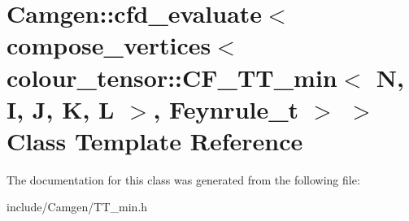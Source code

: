 \hypertarget{a00056}{\section{Camgen\-:\-:cfd\-\_\-evaluate$<$ compose\-\_\-vertices$<$ colour\-\_\-tensor\-:\-:C\-F\-\_\-\-T\-T\-\_\-min$<$ N, I, J, K, L $>$, Feynrule\-\_\-t $>$ $>$ Class Template Reference}
\label{a00056}
}


The documentation for this class was generated from the following file\-:\begin{DoxyCompactItemize}
\item 
include/\-Camgen/T\-T\-\_\-min.\-h\end{DoxyCompactItemize}
